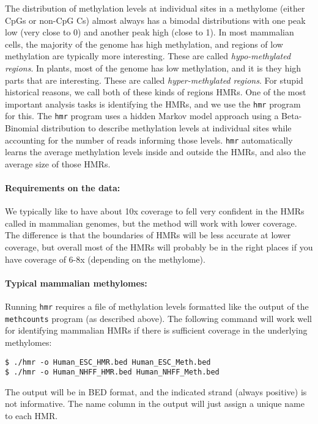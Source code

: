 \documentclass[10pt]{article}
\newcommand{\prog}[1]{\texttt{#1}}
\begin{document}
The distribution of methylation levels at individual sites in a
methylome (either CpGs or non-CpG Cs) almost always has a bimodal
distributions with one peak low (very close to 0) and another peak
high (close to 1). In most mammalian cells, the majority of the genome
has high methylation, and regions of low methylation are typically
more interesting. These are called {\em hypo-methylated regions}. In
plants, most of the genome has low methylation, and it is they high
parts that are interesting. These are called {\em hyper-methylated
  regions}. For stupid historical reasons, we call both of these kinds
of regions HMRs. One of the most important analysis tasks is
identifying the HMRs, and we use the \prog{hmr} program for this. The
\prog{hmr} program uses a hidden Markov model approach using a
Beta-Binomial distribution to describe methylation levels at
individual sites while accounting for the number of reads informing
those levels. \prog{hmr} automatically learns the average methylation
levels inside and outside the HMRs, and also the average size of those
HMRs.

\paragraph{Requirements on the data:} We typically like to have about
10x coverage to fell very confident in the HMRs called in mammalian
genomes, but the method will work with lower coverage. The difference
is that the boundaries of HMRs will be less accurate at lower
coverage, but overall most of the HMRs will probably be in the right
places if you have coverage of 6-8x (depending on the methylome).

\paragraph{Typical mammalian methylomes:}
Running \prog{hmr} requires a file of methylation levels formatted
like the output of the \prog{methcounts} program (as described
above). The following command will work well for identifying mammalian
HMRs if there is sufficient coverage in the underlying methylomes:
\begin{verbatim}
$ ./hmr -o Human_ESC_HMR.bed Human_ESC_Meth.bed
$ ./hmr -o Human_NHFF_HMR.bed Human_NHFF_Meth.bed
\end{verbatim}
The output will be in BED format, and the indicated strand (always
positive) is not informative. The name column in the output will just
assign a unique name to each HMR.
\end{document}
